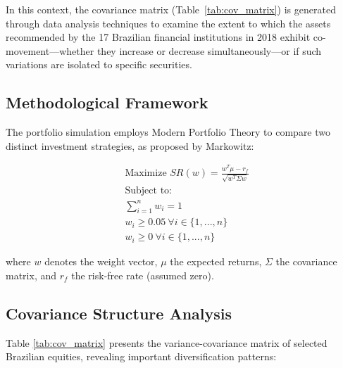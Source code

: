 \documentclass{article}
\begin{document}
In this context, the covariance matrix (Table~\ref{tab:cov_matrix}) is generated through data analysis techniques to examine the extent to which the assets recommended by the 17 Brazilian financial institutions in 2018 exhibit co-movement---whether they increase or decrease simultaneously---or if such variations are isolated to specific securities.

\subsection{Methodological Framework}
The portfolio simulation employs Modern Portfolio Theory \cite{Markowitz_1952} to compare two distinct investment strategies, as proposed by Markowitz:

\begin{equation}
\begin{aligned}
&\text{Maximize } SR(w) = \frac{w^T\mu - r_f}{\sqrt{w^T\Sigma w}} \\
&\text{Subject to: } \\
&\sum_{i=1}^n w_i = 1 \\
&w_i \geq 0.05\ \forall i \in \{1,...,n\} \\
&w_i \geq 0\ \forall i \in \{1,...,n\}
\end{aligned}
\end{equation}

where $w$ denotes the weight vector, $\mu$ the expected returns, $\Sigma$ the covariance matrix, and $r_f$ the risk-free rate (assumed zero).

\subsection{Covariance Structure Analysis}
Table \ref{tab:cov_matrix} presents the variance-covariance matrix of selected Brazilian equities, revealing important diversification patterns:
\end{document}
